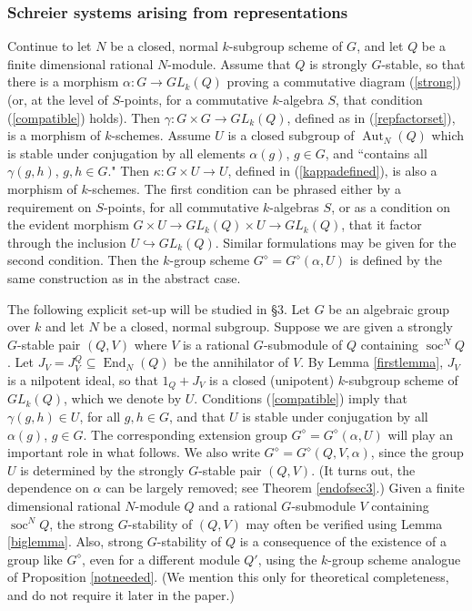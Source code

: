 \documentclass[11pt,leqno,amscd,amssymb,verbatim, url]{amsart}
\theoremstyle{definition}
\numberwithin{equation}{thm}
\newcommand{\End}{\operatorname{End}}
\newcommand{\soc}{\operatorname{soc}}
\newcommand{\Aut}{\operatorname{Aut}}
\begin{document}
\subsubsection{Schreier systems arising from representations}Continue to let $N$ be a closed, normal $k$-subgroup scheme of $G$, and
let $Q$ be a finite dimensional rational $N$-module. Assume that $Q$ is strongly $G$-stable, so that there is a morphism
$\alpha:G\to GL_k(Q)$  proving a commutative diagram (\ref{strong}) (or, at the level of $S$-points, for
a commutative $k$-algebra $S$, that
condition (\ref{compatible}) holds). Then $\gamma:G\times G\to GL_k(Q)$, defined as in (\ref{repfactorset}), 
is a morphism of $k$-schemes.  Assume $U$ is a closed subgroup of $\Aut_N(Q)$ which is stable under conjugation by all  elements
$\alpha(g)$, $g\in G$, and ``contains all $\gamma(g,h)$, $g,h\in G$."  Then
$\kappa:G\times U\to U$, defined in (\ref{kappadefined}), is also a morphism
of $k$-schemes. The first condition can be phrased either by a requirement on
$S$-points, for all commutative $k$-algebras $S$, or as a condition on the evident morphism $G\times U\to GL_k(Q)\times U\to GL_k(Q)$, that it factor through the inclusion $U\hookrightarrow GL_k(Q)$. Similar formulations may be given for the second
condition. Then the $k$-group scheme $G^\diamond=G^\diamond(\alpha,U)$ is defined by the
same construction as in the abstract case.

The following explicit set-up will be studied in \S3. Let $G$ be an algebraic group over $k$ and let $N$ be a closed, normal subgroup. Suppose we are given a strongly $G$-stable pair $(Q,V)$ where $V$ is a rational $G$-submodule of $Q$
containing $\soc^NQ$. Let $J_V=J_V^Q\subseteq\End_N(Q)$ be the annihilator of $V$. By Lemma \ref{firstlemma}, $J_V$ is a nilpotent
ideal, so that $1_Q+J_V$ is a closed (unipotent) $k$-subgroup scheme of $GL_k(Q)$, which we denote by $U$. Conditions (\ref{compatible}) imply that $\gamma(g,h)\in U$, for all $g,h\in G$, and that $U$ is stable under conjugation by all $\alpha(g)$, $g\in G$. The corresponding extension group $G^\diamond=G^\diamond(\alpha, U)$ will play an important role in what follows. We also write $G^\diamond=G^\diamond(Q,V,\alpha)$, since the group $U$ is determined by the strongly $G$-stable pair $(Q,V)$. (It turns out, the dependence on $\alpha$ can be largely removed; see Theorem \ref{endofsec3}.)  Given a finite dimensional rational $N$-module $Q$ and a rational $G$-submodule $V$ containing $\soc^NQ$, the strong
$G$-stability of $(Q,V)$ may often be verified using Lemma
\ref{biglemma}. Also, strong $G$-stability of $Q$ is a consequence of the existence of a group like $G^\diamond$, even for a different module $Q'$, using the $k$-group scheme analogue of Proposition \ref{notneeded}. (We mention this only for theoretical completeness, and do
not require it later in the paper.)
\end{document}
